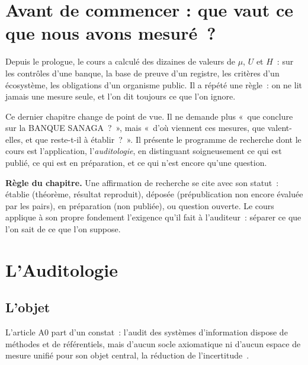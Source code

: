 \bigskip

\section*{Avant de commencer : que vaut ce que nous avons mesuré~?}

Depuis le prologue, le cours a calculé des dizaines de valeurs de $\mu$,
$U$ et $H$~: sur les contrôles d'une banque, la base de preuve d'un
registre, les critères d'un écosystème, les obligations d'un organisme
public. Il a répété une règle~: on ne lit jamais une mesure seule, et l'on
dit toujours ce que l'on ignore.

Ce dernier chapitre change de point de vue. Il ne demande plus «~que
conclure sur la BANQUE SANAGA~?~», mais «~d'où viennent ces mesures, que
valent-elles, et que reste-t-il à établir~?~». Il présente le programme de
recherche dont le cours est l'application, l'\emph{auditologie}, en
distinguant soigneusement ce qui est publié, ce qui est en préparation, et
ce qui n'est encore qu'une question.

\begin{boxalert}
\textbf{Règle du chapitre.} Une affirmation de recherche se cite avec son
statut~: établie (théorème, résultat reproduit), déposée (prépublication
non encore évaluée par les pairs), en préparation (non publiée), ou
question ouverte. Le cours applique à son propre fondement l'exigence qu'il
fait à l'auditeur~: séparer ce que l'on sait de ce que l'on suppose.
\end{boxalert}

\separateur

\section{L'Auditologie}
\label{sec:c16-auditologie}

\subsection{L'objet}

L'article A0 part d'un constat~: l'audit des systèmes d'information dispose
de méthodes et de référentiels, mais d'aucun socle axiomatique ni d'aucun
espace de mesure unifié pour son objet central, la réduction de
l'incertitude~\cite{minka2026auditologie}.

